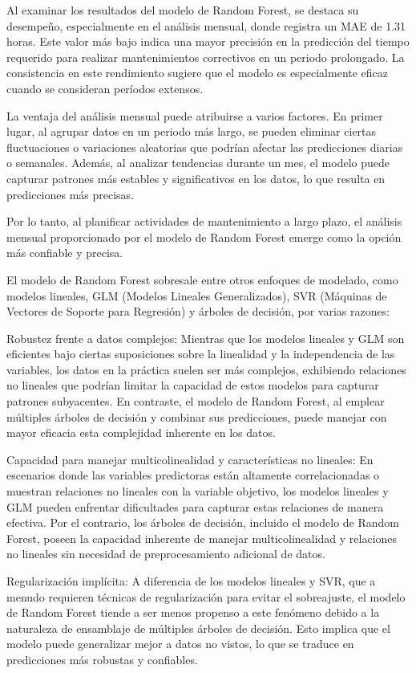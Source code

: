 \documentclass[
  11pt,
  bookmarksnumbered]{article}
\begin{document}
Al examinar los resultados del modelo de Random Forest, se destaca su desempeño, especialmente en el análisis mensual, donde registra un MAE de 1.31 horas.
Este valor más bajo indica una mayor precisión en la predicción del tiempo requerido para realizar mantenimientos correctivos en un periodo prolongado.
La consistencia en este rendimiento sugiere que el modelo es especialmente eficaz cuando se consideran períodos extensos.

La ventaja del análisis mensual puede atribuirse a varios factores.
En primer lugar, al agrupar datos en un periodo más largo, se pueden eliminar ciertas fluctuaciones o variaciones aleatorias que podrían afectar las predicciones diarias o semanales.
Además, al analizar tendencias durante un mes, el modelo puede capturar patrones más estables y significativos en los datos, lo que resulta en predicciones más precisas.

Por lo tanto, al planificar actividades de mantenimiento a largo plazo, el análisis mensual proporcionado por el modelo de Random Forest emerge como la opción más confiable y precisa.

El modelo de Random Forest sobresale entre otros enfoques de modelado, como modelos lineales, GLM (Modelos Lineales Generalizados), SVR (Máquinas de Vectores de Soporte para Regresión) y árboles de decisión, por varias razones:

Robustez frente a datos complejos: Mientras que los modelos lineales y GLM son eficientes bajo ciertas suposiciones sobre la linealidad y la independencia de las variables, los datos en la práctica suelen ser más complejos, exhibiendo relaciones no lineales que podrían limitar la capacidad de estos modelos para capturar patrones subyacentes.
En contraste, el modelo de Random Forest, al emplear múltiples árboles de decisión y combinar sus predicciones, puede manejar con mayor eficacia esta complejidad inherente en los datos.

Capacidad para manejar multicolinealidad y características no lineales: En escenarios donde las variables predictoras están altamente correlacionadas o muestran relaciones no lineales con la variable objetivo, los modelos lineales y GLM pueden enfrentar dificultades para capturar estas relaciones de manera efectiva.
Por el contrario, los árboles de decisión, incluido el modelo de Random Forest, poseen la capacidad inherente de manejar multicolinealidad y relaciones no lineales sin necesidad de preprocesamiento adicional de datos.

Regularización implícita: A diferencia de los modelos lineales y SVR, que a menudo requieren técnicas de regularización para evitar el sobreajuste, el modelo de Random Forest tiende a ser menos propenso a este fenómeno debido a la naturaleza de ensamblaje de múltiples árboles de decisión.
Esto implica que el modelo puede generalizar mejor a datos no vistos, lo que se traduce en predicciones más robustas y confiables.
\end{document}
